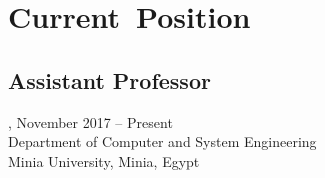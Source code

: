 \section{Current~Position}
\subsection{Assistant Professor}, November 2017 -- Present\\
Department of Computer and System Engineering\\
Minia University, Minia, Egypt
